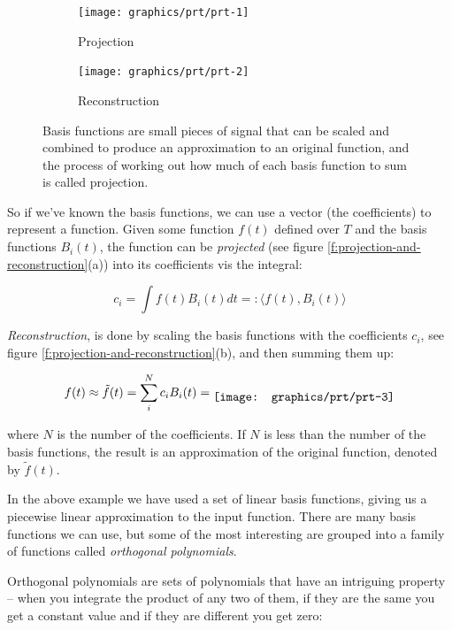 \begin{figure}\label{f:projection-and-reconstruction}
	\begin{center}
		\begin{subfigure}[b]{0.49\textwidth}
			\texttt{[image: graphics/prt/prt-1]}
			\caption{Projection}
		\end{subfigure}
		\begin{subfigure}[b]{0.49\textwidth}
			\texttt{[image: graphics/prt/prt-2]}
			\caption{Reconstruction}
		\end{subfigure}
	\end{center}
	\caption{Basis functions are small pieces of signal that can be scaled and combined to produce an approximation to an original function, and the process of working out how much of each basis function to sum is called projection.}
\end{figure}

So if we've known the basis functions, we can use a vector (the coefficients) to represent a function. Given some function $f(t)$ defined over $T$ and the basis functions $B_i(t)$, the function can be \textit{projected} (see figure \ref{f:projection-and-reconstruction}(a)) into its coefficients vis the integral:

\begin{equation*}
	c_i=\int f(t)B_i(t)dt=:\langle f(t),B_i(t)\rangle
\end{equation*}

\textit{Reconstruction}, is done by scaling the basis functions with the coefficients $c_i$, see figure \ref{f:projection-and-reconstruction}(b), and then summing them up:

\begin{equation*}
	f(t)\approx\tilde{f}(t) =\sum_{i}^{N}c_iB_i(t)=\raisebox{-.5\height}{\texttt{[image: graphics/prt/prt-3]}}
\end{equation*}

where $N$ is the number of the coefficients. If $N$ is less than the number of the basis functions, the result is an approximation of the original function, denoted by $\tilde{f}(t)$.

In the above example we have used a set of linear basis functions, giving us a piecewise linear approximation to the input function. There are many basis functions we can use, but some of the most interesting are grouped into a family of functions called \textit{orthogonal polynomials}.

Orthogonal polynomials are sets of polynomials that have an intriguing property -- when you integrate the product of any two of them, if they are the same you get a constant value and if they are different you get zero:

